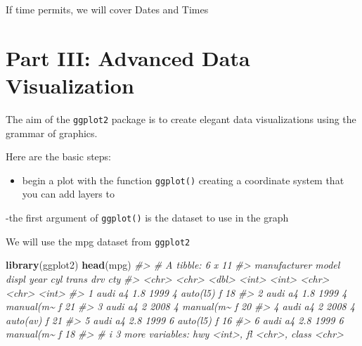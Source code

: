 \documentclass[
]{book}
\newenvironment{Shaded}{\begin{snugshade}}{\end{snugshade}}
\newcommand{\CommentTok}[1]{\textcolor[rgb]{0.56,0.35,0.01}{\textit{#1}}}
\newcommand{\FunctionTok}[1]{\textcolor[rgb]{0.13,0.29,0.53}{\textbf{#1}}}
\newcommand{\NormalTok}[1]{#1}
\providecommand{\tightlist}{%
  \setlength{\itemsep}{0pt}\setlength{\parskip}{0pt}}
\begin{document}
If time permits, we will cover Dates and Times

\chapter*{Part III: Advanced Data Visualization}\label{part-iii-advanced-data-visualization}

The aim of the \texttt{ggplot2} package is to create elegant data visualizations using the grammar of graphics.

Here are the basic steps:

\begin{itemize}
\tightlist
\item
  begin a plot with the function \texttt{ggplot()} creating a coordinate system that you can add layers to
\end{itemize}

-the first argument of \texttt{ggplot()} is the dataset to use in the graph

We will use the mpg dataset from \texttt{ggplot2}

\begin{Shaded}
\begin{Highlighting}[]
\FunctionTok{library}\NormalTok{(ggplot2)}
\FunctionTok{head}\NormalTok{(mpg)}
\CommentTok{\#\textgreater{} \# A tibble: 6 x 11}
\CommentTok{\#\textgreater{}   manufacturer model displ  year   cyl trans     drv     cty}
\CommentTok{\#\textgreater{}   \textless{}chr\textgreater{}        \textless{}chr\textgreater{} \textless{}dbl\textgreater{} \textless{}int\textgreater{} \textless{}int\textgreater{} \textless{}chr\textgreater{}     \textless{}chr\textgreater{} \textless{}int\textgreater{}}
\CommentTok{\#\textgreater{} 1 audi         a4      1.8  1999     4 auto(l5)  f        18}
\CommentTok{\#\textgreater{} 2 audi         a4      1.8  1999     4 manual(m\textasciitilde{} f        21}
\CommentTok{\#\textgreater{} 3 audi         a4      2    2008     4 manual(m\textasciitilde{} f        20}
\CommentTok{\#\textgreater{} 4 audi         a4      2    2008     4 auto(av)  f        21}
\CommentTok{\#\textgreater{} 5 audi         a4      2.8  1999     6 auto(l5)  f        16}
\CommentTok{\#\textgreater{} 6 audi         a4      2.8  1999     6 manual(m\textasciitilde{} f        18}
\CommentTok{\#\textgreater{} \# i 3 more variables: hwy \textless{}int\textgreater{}, fl \textless{}chr\textgreater{}, class \textless{}chr\textgreater{}}
\end{Highlighting}
\end{Shaded}
\end{document}
